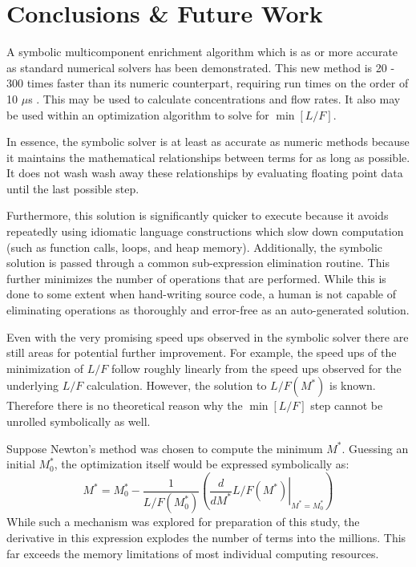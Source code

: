 \documentclass[preprint,12pt]{elsarticle}
\newcommand{\us}[0]{$\mu$s }
\begin{document}
\section{Conclusions \& Future Work}
\label{sec:conc}

A symbolic multicomponent enrichment algorithm which is as or more accurate as 
standard numerical solvers has been demonstrated.  This new method is 20 - 300
times faster than its numeric counterpart, requiring run times on the order of 10 \us.
This may be used to calculate concentrations and flow rates.  It also may be used 
within an optimization algorithm to solve for $\min\left[L/F\right]$.

In essence, the symbolic solver is at least as accurate as numeric methods because
it maintains the mathematical relationships between terms for as long as possible.
It does not wash wash away these relationships by evaluating floating point data
until the last possible step.

Furthermore, this solution is significantly quicker to execute because it avoids
repeatedly using idiomatic language constructions which slow down computation (such
as function calls, loops, and heap memory).  Additionally, the symbolic solution is
passed through a common sub-expression elimination routine.  This further minimizes
the number of operations that are performed.  While this is done to some extent when 
hand-writing source code, a human is not capable of eliminating operations as 
thoroughly and error-free as an auto-generated solution.

Even with the very promising speed ups observed in the symbolic solver there are 
still areas for potential further improvement.  For example, the speed ups of the 
minimization of $L/F$ follow roughly linearly from the speed ups observed for the
underlying $L/F$ calculation.  However, the solution to $L/F(M^*)$ is known.
Therefore there is no theoretical reason why the $\min\left[L/F\right]$ step 
cannot be unrolled symbolically as well.

Suppose Newton's method was chosen to compute the minimum $M^*$.  Guessing 
an initial $M_0^*$, the optimization itself would be expressed symbolically as:
\begin{equation}
M^* = M_0^* - \frac{1}{L/F(M_0^*)}\left(\left.\frac{d}{dM^*}L/F(M^*)\right|_{M^*=M_0^*}\right)
\label{mstar-newton-min}
\end{equation}
While such a mechanism was explored for preparation of this study, the derivative
in this expression explodes the number of terms into the millions.  This far exceeds
the memory limitations of most individual computing resources.  
\end{document}
